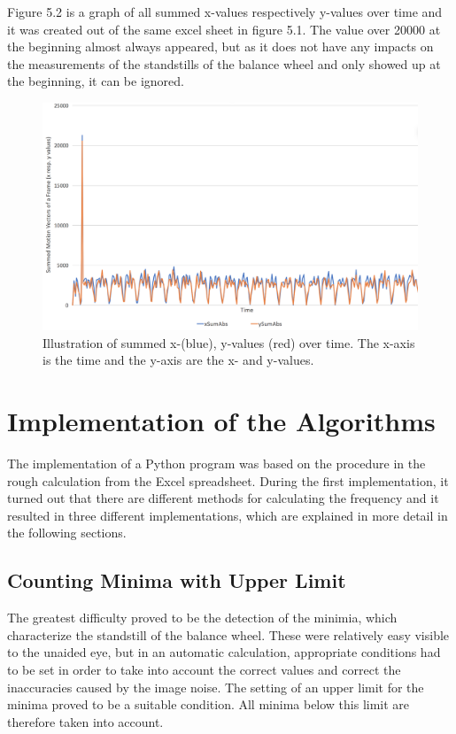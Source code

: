 \documentclass[12pt, a4paper]{report}
\begin{document}
    Figure 5.2 is a graph of all summed x-values respectively y-values over time and it was created out of the same excel sheet in figure 5.1. The value over 20000 at the beginning almost always appeared, but as it does not have any impacts on the measurements of the standstills of the balance wheel and only showed up at the beginning, it can be ignored.

    \noindent
    \begin{figure}[H]
    \centering
    \includegraphics[scale=0.45]{Images/excel_sheet_graph.png}
    
    \caption{Illustration of summed x-(blue), y-values (red) over time. The x-axis is the time and the y-axis are the x- and y-values.}
    \end{figure}
    
       \section{Implementation of the Algorithms}
 The implementation of a Python program was based on the procedure in the rough calculation from the Excel spreadsheet. During the first implementation, it turned out that there are different methods for calculating the frequency and it resulted in three different implementations, which are explained in more detail in the following sections.
    \subsection{Counting Minima with Upper Limit} 
    
    The greatest difficulty proved to be the detection of the minimia, which characterize the standstill of the balance wheel. These were relatively easy visible to the unaided eye, but in an automatic calculation, appropriate conditions had to be set in order to take into account the correct values and correct the inaccuracies caused by the image noise. The setting of an upper limit for the minima proved to be a suitable condition. All minima below this limit are therefore taken into account. 
    
\end{document}
